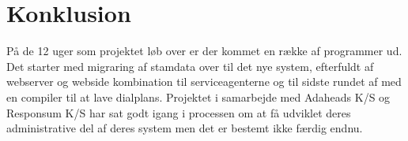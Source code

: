 \chapter{Konklusion}
På de 12 uger som projektet løb over er der kommet en række af programmer ud. Det starter med migraring af stamdata over til det nye system, efterfuldt af webserver og webside kombination til serviceagenterne og til sidste rundet af med en compiler til at lave dialplans. 
Projektet i samarbejde med Adaheads K/S og Responsum K/S har sat godt igang i processen om at få udviklet deres administrative del af deres system men det er bestemt ikke færdig endnu.
